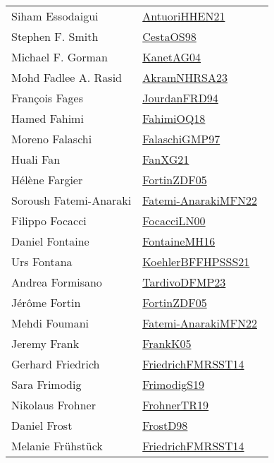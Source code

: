 {\begin{longtable}{p{4cm}p{20cm}}
Siham Essodaigui & \href{works/AntuoriHHEN21.pdf}{AntuoriHHEN21}~\cite{AntuoriHHEN21}\\
Stephen F. Smith & \href{works/CestaOS98.pdf}{CestaOS98}~\cite{CestaOS98}\\
Michael F. Gorman & \href{}{KanetAG04}~\cite{KanetAG04}\\
Mohd Fadlee A. Rasid & \href{works/AkramNHRSA23.pdf}{AkramNHRSA23}~\cite{AkramNHRSA23}\\
Fran{\c{c}}ois Fages & \href{}{JourdanFRD94}~\cite{JourdanFRD94}\\
Hamed Fahimi & \href{works/FahimiOQ18.pdf}{FahimiOQ18}~\cite{FahimiOQ18}\\
Moreno Falaschi & \href{works/FalaschiGMP97.pdf}{FalaschiGMP97}~\cite{FalaschiGMP97}\\
Huali Fan & \href{works/FanXG21.pdf}{FanXG21}~\cite{FanXG21}\\
H{\'{e}}l{\`{e}}ne Fargier & \href{works/FortinZDF05.pdf}{FortinZDF05}~\cite{FortinZDF05}\\
Soroush Fatemi-Anaraki & \href{}{Fatemi-AnarakiMFN22}~\cite{Fatemi-AnarakiMFN22}\\
Filippo Focacci & \href{works/FocacciLN00.pdf}{FocacciLN00}~\cite{FocacciLN00}\\
Daniel Fontaine & \href{works/FontaineMH16.pdf}{FontaineMH16}~\cite{FontaineMH16}\\
Urs Fontana & \href{works/KoehlerBFFHPSSS21.pdf}{KoehlerBFFHPSSS21}~\cite{KoehlerBFFHPSSS21}\\
Andrea Formisano & \href{works/TardivoDFMP23.pdf}{TardivoDFMP23}~\cite{TardivoDFMP23}\\
J{\'{e}}r{\^{o}}me Fortin & \href{works/FortinZDF05.pdf}{FortinZDF05}~\cite{FortinZDF05}\\
Mehdi Foumani & \href{}{Fatemi-AnarakiMFN22}~\cite{Fatemi-AnarakiMFN22}\\
Jeremy Frank & \href{works/FrankK05.pdf}{FrankK05}~\cite{FrankK05}\\
Gerhard Friedrich & \href{}{FriedrichFMRSST14}~\cite{FriedrichFMRSST14}\\
Sara Frimodig & \href{works/FrimodigS19.pdf}{FrimodigS19}~\cite{FrimodigS19}\\
Nikolaus Frohner & \href{works/FrohnerTR19.pdf}{FrohnerTR19}~\cite{FrohnerTR19}\\
Daniel Frost & \href{works/FrostD98.pdf}{FrostD98}~\cite{FrostD98}\\
Melanie Fr{\"{u}}hst{\"{u}}ck & \href{}{FriedrichFMRSST14}~\cite{FriedrichFMRSST14}\\

\end{longtable}}
